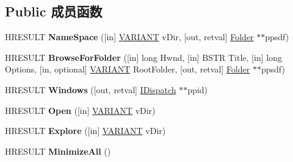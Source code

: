 \subsection*{Public 成员函数}
\begin{DoxyCompactItemize}
\item 
\mbox{\label{interface_shell32_1_1_i_shell_dispatch_ac95d6ecd2d172c22ee1106121efe5191}} 
H\+R\+E\+S\+U\+LT {\bfseries Name\+Space} (\mbox{[}in\mbox{]} \hyperlink{structtag_v_a_r_i_a_n_t}{V\+A\+R\+I\+A\+NT} v\+Dir, \mbox{[}out, retval\mbox{]} \hyperlink{interface_shell32_1_1_folder}{Folder} $\ast$$\ast$ppsdf)
\item 
\mbox{\label{interface_shell32_1_1_i_shell_dispatch_a99c096a117331ba320950652c563afec}} 
H\+R\+E\+S\+U\+LT {\bfseries Browse\+For\+Folder} (\mbox{[}in\mbox{]} long Hwnd, \mbox{[}in\mbox{]} B\+S\+TR Title, \mbox{[}in\mbox{]} long Options, \mbox{[}in, optional\mbox{]} \hyperlink{structtag_v_a_r_i_a_n_t}{V\+A\+R\+I\+A\+NT} Root\+Folder, \mbox{[}out, retval\mbox{]} \hyperlink{interface_shell32_1_1_folder}{Folder} $\ast$$\ast$ppsdf)
\item 
\mbox{\label{interface_shell32_1_1_i_shell_dispatch_a038858c9fa7c25f09330ed9466d49c0c}} 
H\+R\+E\+S\+U\+LT {\bfseries Windows} (\mbox{[}out, retval\mbox{]} \hyperlink{interface_i_dispatch}{I\+Dispatch} $\ast$$\ast$ppid)
\item 
\mbox{\label{interface_shell32_1_1_i_shell_dispatch_a1edc27418c706f9bd769e2fa7f7ac19e}} 
H\+R\+E\+S\+U\+LT {\bfseries Open} (\mbox{[}in\mbox{]} \hyperlink{structtag_v_a_r_i_a_n_t}{V\+A\+R\+I\+A\+NT} v\+Dir)
\item 
\mbox{\label{interface_shell32_1_1_i_shell_dispatch_a11bee83dadc390cb723bf23df455508c}} 
H\+R\+E\+S\+U\+LT {\bfseries Explore} (\mbox{[}in\mbox{]} \hyperlink{structtag_v_a_r_i_a_n_t}{V\+A\+R\+I\+A\+NT} v\+Dir)
\item 
\mbox{\label{interface_shell32_1_1_i_shell_dispatch_a89373a9c697d7e0ae79fc0c59e685729}} 
H\+R\+E\+S\+U\+LT {\bfseries Minimize\+All} ()
\item 
$$
\end{DoxyCompactItemize}
